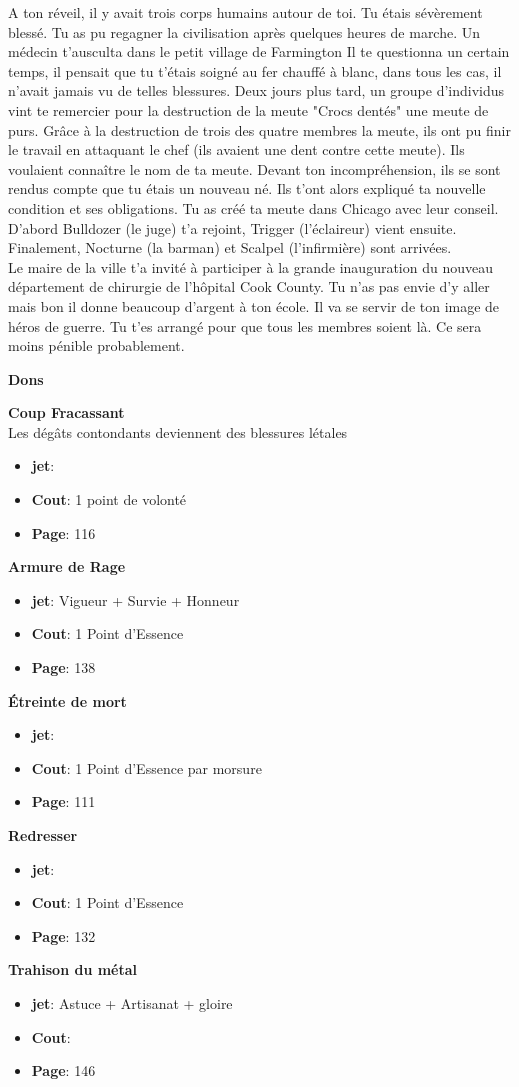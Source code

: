 \documentclass[oneside,12pt]{book}
\newcommand\don[5]{
\textbf{#1} \\
#2
\begin{itemize}
\item{ \textbf{jet}: #3}
\item{ \textbf{Cout}: #4}
\item{ \textbf{Page}: #5}
\end{itemize}
\vspace{0.5cm}
}
\begin{document}
\begin{flushleft}
\begin{description}
{A ton réveil, il y avait trois corps humains autour de toi. Tu étais sévèrement blessé. 
Tu as pu regagner la civilisation après quelques heures de marche. Un médecin t'ausculta dans le petit village de Farmington 
Il te questionna un certain temps, il pensait que tu t'étais soigné au fer chauffé à blanc, dans tous les cas, il n'avait jamais vu de telles blessures. 
Deux jours plus tard, un groupe d'individus vint te remercier pour la destruction de la meute "Crocs dentés" une meute de purs. 
Grâce à la destruction de trois des quatre membres la meute, ils ont pu finir le travail en attaquant le chef (ils avaient une dent contre cette meute). 
Ils voulaient connaître le nom de ta meute. Devant ton incompréhension, ils se sont rendus compte que tu étais un nouveau né. 
Ils t'ont alors expliqué ta nouvelle condition et ses obligations. Tu as créé ta meute dans Chicago avec leur conseil. 
D'abord  Bulldozer (le juge) t'a rejoint, Trigger (l'éclaireur) vient ensuite. Finalement, Nocturne (la barman) et Scalpel (l'infirmière) sont arrivées. 
\\
Le maire de la ville t'a invité à participer à la grande inauguration du nouveau département de chirurgie de l'hôpital Cook County. 
Tu n'as pas envie d'y aller mais bon il donne beaucoup d'argent à ton école. Il va se servir de ton image de héros de guerre. Tu t'es arrangé pour que tous les membres
soient là. Ce sera moins pénible probablement.   
}
\end{description}
\clearpage
\textbf{\large Dons} 
\vspace{0.5cm}


\don{Coup Fracassant}{Les dégâts contondants deviennent des blessures létales}{}{1 point de volonté}{116}
\don{Armure de Rage}{}{Vigueur + Survie + Honneur}{1 Point d'Essence}{138}
\don{Étreinte de mort}{}{}{1 Point d'Essence par morsure}{111}
\don{Redresser}{}{}{1 Point d'Essence}{132}
\don{Trahison du métal}{}{Astuce + Artisanat + gloire}{}{146}



\clearpage

\end{flushleft}
\end{document}
